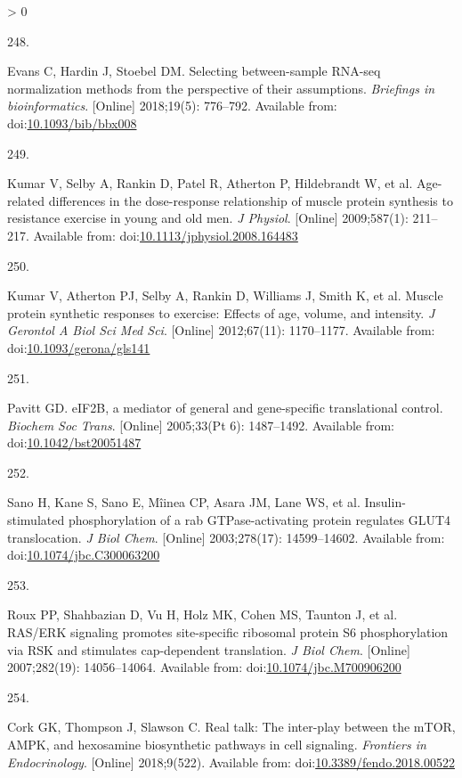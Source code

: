 \documentclass[twoside,10pt]{gihclass} %
\newlength{\cslhangindent}
\newlength{\csllabelwidth}
\newenvironment{CSLReferences}[3] %
 {%
  \setlength{\parindent}{0pt}
  \ifodd #1 \everypar{\setlength{\hangindent}{\cslhangindent}}\ignorespaces\fi
  \ifnum #2 > 0
  \setlength{\parskip}{#2\baselineskip}
  \fi
 }%
 {}
\newcommand{\CSLLeftMargin}[1]{\parbox[t]{\maxof{\widthof{#1}}{\csllabelwidth}}{#1}}
\newcommand{\CSLRightInline}[1]{\parbox[t]{\linewidth}{#1}}
\begin{document}
\begin{CSLReferences}{0}{0}
\leavevmode\hypertarget{ref-RN2878}{}%
\CSLLeftMargin{248. }
\CSLRightInline{Evans C, Hardin J, Stoebel DM. Selecting between-sample RNA-seq normalization methods from the perspective of their assumptions. \emph{Briefings in bioinformatics}. {[}Online{]} 2018;19(5): 776--792. Available from: doi:\href{https://doi.org/10.1093/bib/bbx008}{10.1093/bib/bbx008}}

\leavevmode\hypertarget{ref-RN2720}{}%
\CSLLeftMargin{249. }
\CSLRightInline{Kumar V, Selby A, Rankin D, Patel R, Atherton P, Hildebrandt W, et al. Age-related differences in the dose-response relationship of muscle protein synthesis to resistance exercise in young and old men. \emph{J Physiol}. {[}Online{]} 2009;587(1): 211--217. Available from: doi:\href{https://doi.org/10.1113/jphysiol.2008.164483}{10.1113/jphysiol.2008.164483}}

\leavevmode\hypertarget{ref-RN2716}{}%
\CSLLeftMargin{250. }
\CSLRightInline{Kumar V, Atherton PJ, Selby A, Rankin D, Williams J, Smith K, et al. Muscle protein synthetic responses to exercise: Effects of age, volume, and intensity. \emph{J Gerontol A Biol Sci Med Sci}. {[}Online{]} 2012;67(11): 1170--1177. Available from: doi:\href{https://doi.org/10.1093/gerona/gls141}{10.1093/gerona/gls141}}

\leavevmode\hypertarget{ref-RN2853}{}%
\CSLLeftMargin{251. }
\CSLRightInline{Pavitt GD. eIF2B, a mediator of general and gene-specific translational control. \emph{Biochem Soc Trans}. {[}Online{]} 2005;33(Pt 6): 1487--1492. Available from: doi:\href{https://doi.org/10.1042/bst20051487}{10.1042/bst20051487}}

\leavevmode\hypertarget{ref-RN2856}{}%
\CSLLeftMargin{252. }
\CSLRightInline{Sano H, Kane S, Sano E, Mîinea CP, Asara JM, Lane WS, et al. Insulin-stimulated phosphorylation of a rab GTPase-activating protein regulates GLUT4 translocation. \emph{J Biol Chem}. {[}Online{]} 2003;278(17): 14599--14602. Available from: doi:\href{https://doi.org/10.1074/jbc.C300063200}{10.1074/jbc.C300063200}}

\leavevmode\hypertarget{ref-RN2311}{}%
\CSLLeftMargin{253. }
\CSLRightInline{Roux PP, Shahbazian D, Vu H, Holz MK, Cohen MS, Taunton J, et al. RAS/ERK signaling promotes site-specific ribosomal protein S6 phosphorylation via RSK and stimulates cap-dependent translation. \emph{J Biol Chem}. {[}Online{]} 2007;282(19): 14056--14064. Available from: doi:\href{https://doi.org/10.1074/jbc.M700906200}{10.1074/jbc.M700906200}}

\leavevmode\hypertarget{ref-RN2858}{}%
\CSLLeftMargin{254. }
\CSLRightInline{Cork GK, Thompson J, Slawson C. Real talk: The inter-play between the mTOR, AMPK, and hexosamine biosynthetic pathways in cell signaling. \emph{Frontiers in Endocrinology}. {[}Online{]} 2018;9(522). Available from: doi:\href{https://doi.org/10.3389/fendo.2018.00522}{10.3389/fendo.2018.00522}}


\end{CSLReferences}
\end{document}
